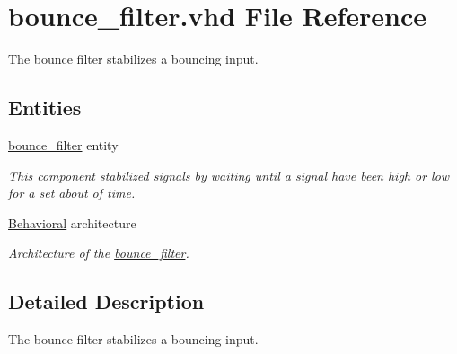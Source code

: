 \hypertarget{bounce__filter_8vhd}{\section{bounce\-\_\-filter.\-vhd File Reference}
\label{bounce__filter_8vhd}
}


The bounce filter stabilizes a bouncing input.  


\subsection*{Entities}
\begin{DoxyCompactItemize}
\item 
\hyperlink{classbounce__filter}{bounce\-\_\-filter} entity
\begin{DoxyCompactList}\small\item\em This component stabilized signals by waiting until a signal have been high or low for a set about of time. \end{DoxyCompactList}\item 
\hyperlink{classbounce__filter_1_1Behavioral}{Behavioral} architecture
\begin{DoxyCompactList}\small\item\em Architecture of the \hyperlink{classbounce__filter}{bounce\-\_\-filter}. \end{DoxyCompactList}\end{DoxyCompactItemize}


\subsection{Detailed Description}
The bounce filter stabilizes a bouncing input. 
